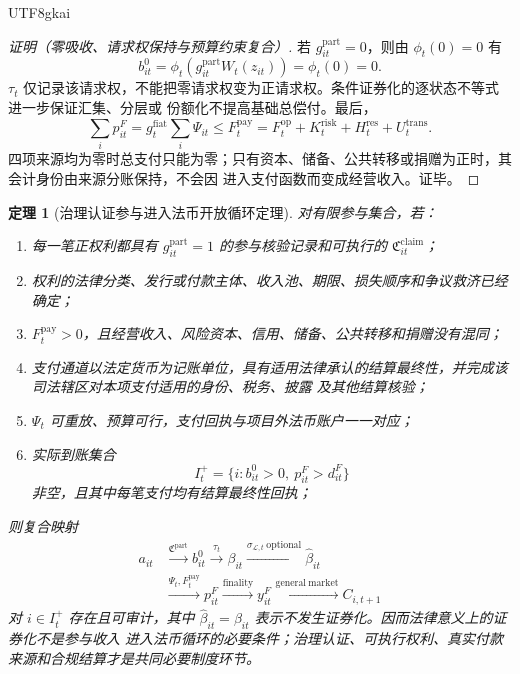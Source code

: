 \documentclass[12pt,a4paper,openany]{report}
\newtheorem{theorem}{定理}[chapter]
\begin{document}
\begin{CJK*}{UTF8}{gkai}
\begin{proof}[证明（零吸收、请求权保持与预算约束复合）]
若 \(g_{it}^{\mathrm{part}}=0\)，则由 \(\phi_t(0)=0\) 有
\[
  b_{it}^{0}
  =\phi_t\!\left(g_{it}^{\mathrm{part}}W_t(z_{it})\right)
  =\phi_t(0)=0.
\]
\(\tau_t\) 仅记录该请求权，不能把零请求权变为正请求权。条件证券化的逐状态不等式进一步保证汇集、分层或
份额化不提高基础总偿付。最后，
\[
  \sum_i p_{it}^{F}
  =g_t^{\mathrm{fiat}}\sum_i\Psi_{it}
  \le F_t^{\mathrm{pay}}
  =F_t^{\mathrm{op}}+K_t^{\mathrm{risk}}+H_t^{\mathrm{res}}+U_t^{\mathrm{trans}}.
\]
四项来源均为零时总支付只能为零；只有资本、储备、公共转移或捐赠为正时，其会计身份由来源分账保持，不会因
进入支付函数而变成经营收入。证毕。
\end{proof}

\begin{theorem}[治理认证参与进入法币开放循环定理]
\label{thm:certified-participation-fiat-cycle}
对有限参与集合，若：
\begin{enumerate}[label=\textup{(\roman*)},leftmargin=3em]
  \item 每一笔正权利都具有 \(g_{it}^{\mathrm{part}}=1\) 的参与核验记录和可执行的
  \(\mathfrak C_{it}^{\mathrm{claim}}\)；
  \item 权利的法律分类、发行或付款主体、收入池、期限、损失顺序和争议救济已经确定；
  \item \(F_t^{\mathrm{pay}}>0\)，且经营收入、风险资本、信用、储备、公共转移和捐赠没有混同；
  \item 支付通道以法定货币为记账单位，具有适用法律承认的结算最终性，并完成该司法辖区对本项支付适用的身份、税务、披露
  及其他结算核验；
  \item \(\Psi_t\) 可重放、预算可行，支付回执与项目外法币账户一一对应；
  \item 实际到账集合
  \[
    I_t^+=\{i:b_{it}^{0}>0,\ p_{it}^{F}>d_{it}^{F}\}
  \]
  非空，且其中每笔支付均有结算最终性回执；
\end{enumerate}
则复合映射
\[
\begin{aligned}
  a_{it}
  &\xrightarrow{\mathfrak C^{\mathrm{part}}}
  b_{it}^{0}
  \xrightarrow{\tau_t}
  \beta_{it}
  \xrightarrow{\sigma_{\mathcal L,t}\ \mathrm{optional}}
  \widehat\beta_{it}\\
  &\xrightarrow{\Psi_t,F_t^{\mathrm{pay}}}
  p_{it}^{F}
  \xrightarrow{\mathrm{finality}}
  y_{it}^{F}
  \xrightarrow{\mathrm{general\ market}}
  C_{i,t+1}
\end{aligned}
\]
对 \(i\in I_t^+\) 存在且可审计，其中 \(\widehat\beta_{it}=\beta_{it}\) 表示不发生证券化。因而法律意义上的证券化不是参与收入
进入法币循环的必要条件；治理认证、可执行权利、真实付款来源和合规结算才是共同必要制度环节。
\end{theorem}


\end{CJK*}
\end{document}
